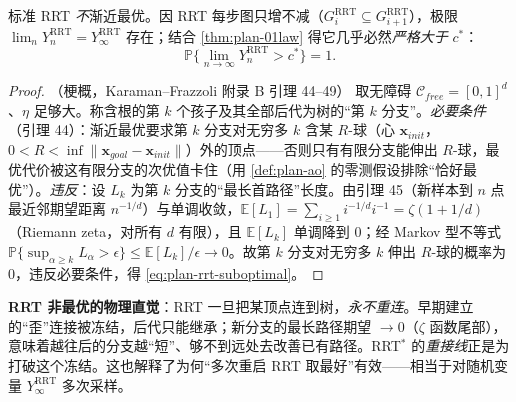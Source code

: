 \begin{theorem}\label{thm:plan-rrt-noopt}
标准 RRT \emph{不}渐近最优。因 RRT 每步图只增不减（$G_i^{\mathrm{RRT}}\subseteq G_{i+1}^{\mathrm{RRT}}$），极限 $\lim_n Y_n^{\mathrm{RRT}}=Y_\infty^{\mathrm{RRT}}$ 存在；结合 \cref{thm:plan-01law} 得它几乎必然\emph{严格大于} $c^*$：
\begin{equation}
  \mathbb{P}\Big\{\lim_{n\to\infty}Y_n^{\mathrm{RRT}}>c^*\Big\}=1.
  \label{eq:plan-rrt-suboptimal}
\end{equation}
\end{theorem}
\begin{proof}（梗概，Karaman--Frazzoli\cite{karaman2011sampling} 附录 B 引理 44--49\rebuilt）
取无障碍 $\mathcal{C}_{free}=[0,1]^d$、$\eta$ 足够大。称含根的第 $k$ 个孩子及其全部后代为树的“第 $k$ 分支”。\emph{必要条件}（引理 44）：渐近最优要求第 $k$ 分支对无穷多 $k$ 含某 $R$-球（心 $\mathbf{x}_{init}$，$0<R<\inf\|\mathbf{x}_{goal}-\mathbf{x}_{init}\|$）外的顶点——否则只有有限分支能伸出 $R$-球，最优代价被这有限分支的次优值卡住（用 \cref{def:plan-ao} 的零测假设排除“恰好最优”）。\emph{违反}：设 $L_k$ 为第 $k$ 分支的“最长首路径”长度。由引理 45（新样本到 $n$ 点最近邻期望距离 $n^{-1/d}$）与单调收敛，$\mathbb{E}[L_1]=\sum_{i\ge1}i^{-1/d}i^{-1}=\zeta(1+1/d)$（Riemann zeta，对所有 $d$ 有限），且 $\mathbb{E}[L_k]$ 单调降到 0；经 Markov 型不等式 $\mathbb{P}\{\sup_{\alpha\ge k}L_\alpha>\epsilon\}\le\mathbb{E}[L_k]/\epsilon\to0$。故第 $k$ 分支对无穷多 $k$ 伸出 $R$-球的概率为 0，违反必要条件，得 \cref{eq:plan-rrt-suboptimal}。
\end{proof}

\begin{insight}
\textbf{RRT 非最优的物理直觉}：RRT 一旦把某顶点连到树，\emph{永不重连}。早期建立的“歪”连接被冻结，后代只能继承；新分支的最长路径期望 $\to0$（$\zeta$ 函数尾部），意味着越往后的分支越“短”、够不到远处去改善已有路径。RRT$^*$ 的\emph{重接线}正是为打破这个冻结。这也解释了为何“多次重启 RRT 取最好”有效——相当于对随机变量 $Y_\infty^{\mathrm{RRT}}$ 多次采样。
\end{insight}

